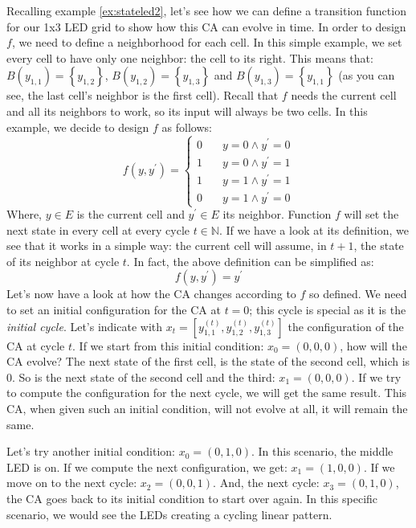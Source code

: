\begin{example}
\label{ex:stateled3}
Recalling example \ref{ex:stateled2}, let's see how we can define a transition function for our
1x3 LED grid to show how this CA can evolve in time. In order to design $f$, we need to define
a neighborhood for each cell. In this simple example, we set every cell to have only one neighbor:
the cell to its right. This means that: $B\left( y_{1,1} \right) = \left\{ y_{1,2} \right\}$,
$B\left( y_{1,2} \right) = \left\{ y_{1,3} \right\}$ and 
$B\left( y_{1,3} \right) = \left\{ y_{1,1} \right\}$ (as you can see, the last cell's
neighbor is the first cell).
Recall that $f$ needs the current cell
and all its neighbors to work, so its input will always be two cells.
In this example, we decide to design $f$ as follows:
\begin{equation*}
f \left( y, y^\prime \right) =
  \begin{cases}
    0       & \quad y = 0 \wedge y^\prime = 0\\
    1       & \quad y = 0 \wedge y^\prime = 1\\
    1       & \quad y = 1 \wedge y^\prime = 1\\
    0       & \quad y = 1 \wedge y^\prime = 0
  \end{cases}
\end{equation*}
Where, $y \in E$ is the current cell and $y^\prime \in E$ its neighbor.
Function $f$ will set the next state in every cell at every cycle $t \in \mathbb{N}$. If we have a look
at its definition, we see that it works in a simple way: the current cell will assume, in $t+1$, the state
of its neighbor at cycle $t$. In fact, the above definition can be simplified as:
\begin{equation*}
f \left( y, y^\prime \right) = y^\prime
\end{equation*}
Let's now have a look at how the CA changes according to $f$ so defined.
We need to set an initial configuration for the CA at $t=0$; this cycle is special as it is the
\textit{initial cycle}. Let's indicate with 
$x_t = \left[ y^{(t)}_{1,1}, y^{(t)}_{1,2}, y^{(t)}_{1,3} \right]$ the configuration of the CA
at cycle $t$. If we start from this initial condition:
$x_0 = (0,0,0)$, how will the CA evolve? The next state of the first cell, is the state of the second
cell, which is $0$. So is the next state of the second cell and the third: $x_1 = (0,0,0)$. If we try
to compute the configuration for the next cycle, we will get the same result. This CA, when given
such an initial condition, will not evolve at all, it will remain the same.

Let's try another initial condition: $x_0 = (0,1,0)$. In this scenario, the middle LED is on.
If we compute the next configuration, we get: $x_1 = (1,0,0)$. If we move on to the next cycle:
$x_2 = (0,0,1)$. And, the next cycle: $x_3 = (0,1,0)$, the CA goes back to its initial condition
to start over again. In this specific scenario, we would see the LEDs creating a cycling linear pattern.
\end{example}

